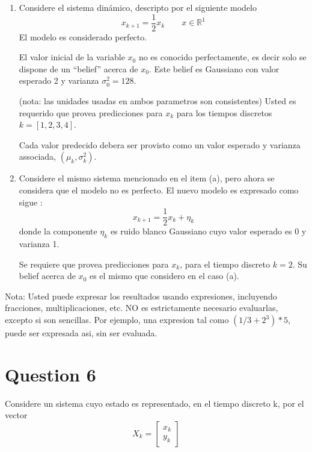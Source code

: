 \documentclass[parcial]{lcc}
\begin{document}
\begin{enumerate}

\item Considere el sistema dinámico, descripto por el siguiente modelo 
\begin{equation*}
    x_{k+1} = \frac{1}{2}x_{k} \qquad x \in \mathbb{R}^{1}
\end{equation*}
El modelo es considerado perfecto.

El valor inicial de la variable $x_0$ no es conocido perfectamente, es decir solo se dispone de un ``belief'' acerca de  $x_0$. Este belief es Gaussiano con valor esperado 2 y varianza $\sigma^2_{0} = 128$.

(nota: las unidades usadas en ambos parametros son consistentes)
Usted es requerido que provea predicciones para $x_k$ para los tiempos discretos $k=[1,2,3,4]$.

Cada valor predecido debera ser provisto como un valor esperado y varianza associada,
$\left(\mu_{k}, \sigma_{k}^2\right)$.

\item Considere el mismo sistema mencionado en el item (a), pero ahora se considera que el modelo no es perfecto. El nuevo modelo es expresado como sigue :
\begin{equation*}
    x_{k+1} = \frac{1}{2}x_k + \eta_k
\end{equation*}
donde la componente $\eta_k$ es ruido blanco Gaussiano cuyo valor esperado es 0 y varianza 1.

Se requiere que provea predicciones para $x_{k}$, para el tiempo discreto $k=2$. Su belief acerca de $x_0$ es el mismo que considero en el caso (a).

\end{enumerate}

Nota: Usted puede expresar los resultados usando expresiones, incluyendo fracciones, multiplicaciones, etc. NO es estrictamente necesario evaluarlas, excepto si son sencillas. Por ejemplo, una expresion tal como $(1/3 +2^3)*5$, puede ser expresada asi, sin ser evaluada.

\section*{Question 6}
Considere un sistema cuyo estado es representado, en el tiempo discreto k, por el vector
\begin{equation*}
    X_{k} = \begin{bmatrix}
            x_{k}\\
            y_{k}
        \end{bmatrix}
\end{equation*}
\end{document}
